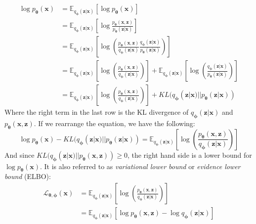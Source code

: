 \documentclass[12pt]{report}
\theoremstyle{definition}
\begin{document}
\begin{equation}
\begin{split}
	\log p_{\mathbf{\theta}}(\mathbf{x}) 
	& = \mathbb{E}_{q_{\mathbf{\phi}}(\mathbf{z}|\mathbf{x})}\left[\log p_{\mathbf{\theta}}(\mathbf{x})\right] \\
	& = \mathbb{E}_{q_{\mathbf{\phi}}(\mathbf{z}|\mathbf{x})}\left[ \log \frac{p_{\mathbf{\theta}}(\mathbf{x}, \mathbf{z})}{p_{\mathbf{\theta}}(\mathbf{z}|\mathbf{x})} \right] \\
	& = \mathbb{E}_{q_{\mathbf{\phi}}(\mathbf{z}|\mathbf{x})}\left[ \log\left(\frac{p_{\mathbf{\theta}}(\mathbf{x}, \mathbf{z})}{q_{\mathbf{\phi}}(\mathbf{z}|\mathbf{x})}\frac{q_{\mathbf{\phi}}(\mathbf{z}|\mathbf{x})}{p_{\mathbf{\theta}}(\mathbf{z}|\mathbf{x})} \right) \right] \\
	& = \mathbb{E}_{q_{\mathbf{\phi}}(\mathbf{z}|\mathbf{x})}\left[ \log\left(\frac{p_{\mathbf{\theta}}(\mathbf{x}, \mathbf{z})}{q_{\mathbf{\phi}}(\mathbf{z}|\mathbf{x})}\right) \right] + \mathbb{E}_{q_{\mathbf{\phi}}(\mathbf{z}|\mathbf{x})}\left[ \log\left(\frac{q_{\mathbf{\phi}}(\mathbf{z}|\mathbf{x})}{p_{\mathbf{\theta}}(\mathbf{z}|\mathbf{x})} \right) \right] \\
	& = \mathbb{E}_{q_{\mathbf{\phi}}(\mathbf{z}|\mathbf{x})}\left[ \log\left(\frac{p_{\mathbf{\theta}}(\mathbf{x}, \mathbf{z})}{q_{\mathbf{\phi}}(\mathbf{z}|\mathbf{x})}\right) \right] + KL(q_{\mathbf{\phi}}(\mathbf{z}|\mathbf{x}) || p_{\mathbf{\theta}}(\mathbf{z}| \mathbf{x})) 
\end{split}
\end{equation}
Where the right term in the last row is the KL divergence of $q_{\mathbf{\phi}}(\mathbf{z}|\mathbf{x})$ and $p_{\mathbf{\theta}}(\mathbf{x}, \mathbf{z})$. If we rearrange the equation, we have the following:
\begin{equation}
	\log p_{\mathbf{\theta}}(\mathbf{x}) - KL(q_{\mathbf{\phi}}(\mathbf{z}|\mathbf{x}) || p_{\mathbf{\theta}}(\mathbf{z}| \mathbf{x})) = \mathbb{E}_{q_{\mathbf{\phi}}(\mathbf{z}|\mathbf{x})}\left[ \log\left(\frac{p_{\mathbf{\theta}}(\mathbf{x}, \mathbf{z})}{q_{\mathbf{\phi}}(\mathbf{z}|\mathbf{x})}\right) \right]
\end{equation}
And since $KL(q_{\mathbf{\phi}}(\mathbf{z}|\mathbf{x}) || p_{\mathbf{\theta}}(\mathbf{x}, \mathbf{z})) \geq 0$, the right hand side is a lower bound for $\log p_{\mathbf{\theta}}(\mathbf{x})$. It is also referred to as \emph{variational lower bound} or \emph{evidence lower bound} (ELBO):
\begin{equation}
\begin{split}
	\mathcal{L}_{\mathbf{\theta}, \mathbf{\phi}}(\mathbf{x}) 
	& = \mathbb{E}_{q_{\mathbf{\phi}}(\mathbf{z}|\mathbf{x})}\left[ \log\left(\frac{p_{\mathbf{\theta}}(\mathbf{x}, \mathbf{z})}{q_{\mathbf{\phi}}(\mathbf{z}|\mathbf{x})}\right) \right] \\
	& = \mathbb{E}_{q_{\mathbf{\phi}}(\mathbf{z}|\mathbf{x})}\left[ \log p_{\mathbf{\theta}}(\mathbf{x}, \mathbf{z}) - \log q_{\mathbf{\phi}}(\mathbf{z}|\mathbf{x}) \right] \\\\
\end{split}
\end{equation}
\end{document}
